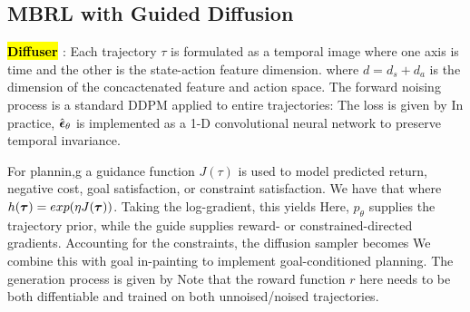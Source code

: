 \documentclass{article}
\begin{document}
\subsection{MBRL with Guided Diffusion}
  \textbf{\hl{Diffuser} \cite{janner2022planning}}: Each trajectory $\tau$ is formulated as a temporal image where one axis is time and the other is the state-action feature dimension.
  where $d=d_s+d_a$ is the dimension of the concactenated feature and action space. The forward noising process is a standard DDPM applied to entire trajectories:
  The loss is given by
  In practice, $\hat{\boldsymbol{\epsilon}}_\theta$ is implemented as a 1-D convolutional neural network to preserve temporal invariance.

  For plannin,g a guidance function $J(\tau)$ is used to model predicted return, negative cost, goal satisfaction, or constraint satisfaction. We have that
  where $h(\boldsymbol{\tau})=exp(\eta J(\boldsymbol{\tau}))$. Taking the log-gradient, this yields
  Here, $p_\theta$ supplies the trajectory prior, while the guide supplies reward- or constrained-directed gradients. Accounting for the constraints, the diffusion sampler becomes 
  We combine this with goal in-painting to implement goal-conditioned planning. The generation process is given by
  Note that the roward function $r$ here needs to be both diffentiable and trained on both unnoised/noised trajectories.
\end{document}
